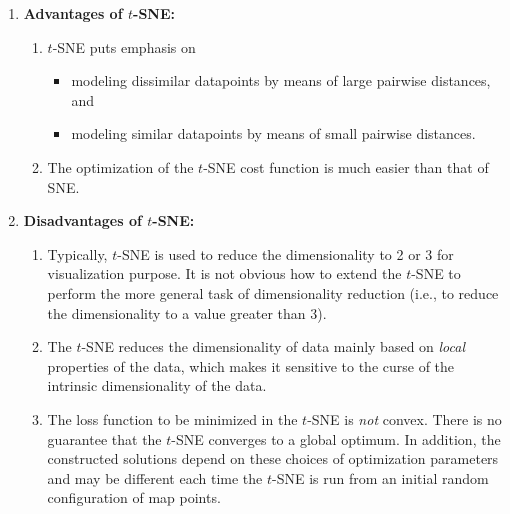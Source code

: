 \documentclass[12pt]{article}
\begin{document}
\begin{enumerate}[label=\textbf{\arabic*.}]
	\item \textbf{Advantages of $t$-SNE:} 
	\begin{enumerate}
		\item $t$-SNE puts emphasis on 
		\begin{itemize}
			\item modeling dissimilar datapoints by means of large pairwise distances, and 
			\item modeling similar datapoints by means of small pairwise distances. 
		\end{itemize}
		\item The optimization of the $t$-SNE cost function is much easier than that of SNE. %
	\end{enumerate}
		
	\item \textbf{Disadvantages of $t$-SNE:} 
	\begin{enumerate}
		\item Typically, $t$-SNE is used to reduce the dimensionality to 2 or 3 for visualization purpose. It is not obvious how to extend the $t$-SNE to perform the more general task of dimensionality reduction (i.e., to reduce the dimensionality to a value greater than 3). 
		\item The $t$-SNE reduces the dimensionality of data mainly based on \emph{local} properties of the data, which makes it sensitive to the curse of the intrinsic dimensionality of the data. 
		\item The loss function to be minimized in the $t$-SNE is \emph{not} convex. There is no guarantee that the $t$-SNE converges to a global optimum. In addition, the constructed solutions depend on these choices of optimization parameters and may be different each time the $t$-SNE is run from an initial random configuration of map points. 
	\end{enumerate}
	
\end{enumerate}


\printbibliography
\end{document}
